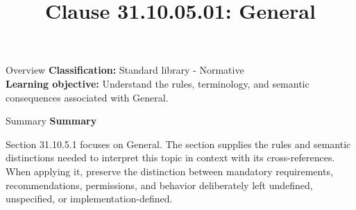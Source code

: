\documentclass[10pt,letterpaper]{article}
\title{Clause 31.10.05.01: General}
\author{}
\date{}
\begin{document}
\maketitle
\begin{CornellOverviewBox}{Overview}
\textbf{Classification:} Standard library - Normative\\[2pt]
\textbf{Learning objective:} Understand the rules, terminology, and semantic consequences associated with General.
\end{CornellOverviewBox}\begin{CornellSummaryBox}{Summary}
{\sffamily\bfseries\color{Accent} Summary}\par\vspace{3pt}Section 31.10.5.1 focuses on General. The section supplies the rules and semantic distinctions needed to interpret this topic in context with its cross-references. When applying it, preserve the distinction between mandatory requirements, recommendations, permissions, and behavior deliberately left undefined, unspecified, or implementation-defined.
\end{CornellSummaryBox}
\end{document}
